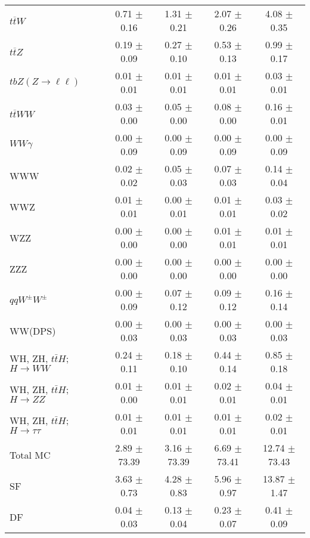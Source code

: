 \begin{tabular}{l|cccc}
                   $t\overline{t}W$ &  0.71 $\pm$  0.16 &  1.31 $\pm$  0.21 &  2.07 $\pm$  0.26 &  4.08 $\pm$  0.35 \\
                   $t\overline{t}Z$ &  0.19 $\pm$  0.09 &  0.27 $\pm$  0.10 &  0.53 $\pm$  0.13 &  0.99 $\pm$  0.17 \\
    $tbZ (Z \rightarrow \ell \ell)$ &  0.01 $\pm$  0.01 &  0.01 $\pm$  0.01 &  0.01 $\pm$  0.01 &  0.03 $\pm$  0.01 \\
                  $t\overline{t}WW$ &  0.03 $\pm$  0.00 &  0.05 $\pm$  0.00 &  0.08 $\pm$  0.00 &  0.16 $\pm$  0.01 \\
                         $WW\gamma$ &  0.00 $\pm$  0.09 &  0.00 $\pm$  0.09 &  0.00 $\pm$  0.09 &  0.00 $\pm$  0.09 \\
                                WWW &  0.02 $\pm$  0.02 &  0.05 $\pm$  0.03 &  0.07 $\pm$  0.03 &  0.14 $\pm$  0.04 \\
                                WWZ &  0.01 $\pm$  0.01 &  0.00 $\pm$  0.01 &  0.01 $\pm$  0.01 &  0.03 $\pm$  0.02 \\
                                WZZ &  0.00 $\pm$  0.00 &  0.00 $\pm$  0.00 &  0.01 $\pm$  0.01 &  0.01 $\pm$  0.01 \\
                                ZZZ &  0.00 $\pm$  0.00 &  0.00 $\pm$  0.00 &  0.00 $\pm$  0.00 &  0.00 $\pm$  0.00 \\
                 $qqW^{\pm}W^{\pm}$ &  0.00 $\pm$  0.09 &  0.07 $\pm$  0.12 &  0.09 $\pm$  0.12 &  0.16 $\pm$  0.14 \\
                            WW(DPS) &  0.00 $\pm$  0.03 &  0.00 $\pm$  0.03 &  0.00 $\pm$  0.03 &  0.00 $\pm$  0.03 \\
WH, ZH, $t\bar{t}H$; $H \rightarrow WW$ &  0.24 $\pm$  0.11 &  0.18 $\pm$  0.10 &  0.44 $\pm$  0.14 &  0.85 $\pm$  0.18 \\
WH, ZH, $t\bar{t}H$; $H \rightarrow ZZ$ &  0.01 $\pm$  0.00 &  0.01 $\pm$  0.01 &  0.02 $\pm$  0.01 &  0.04 $\pm$  0.01 \\
WH, ZH, $t\bar{t}H$; $H \rightarrow \tau\tau$ &  0.01 $\pm$  0.01 &  0.01 $\pm$  0.01 &  0.01 $\pm$  0.01 &  0.02 $\pm$  0.01 \\
\hline\hline
                           Total MC &  2.89 $\pm$ 73.39 &  3.16 $\pm$ 73.39 &  6.69 $\pm$ 73.41 & 12.74 $\pm$ 73.43 \\
\hline
                                 SF &  3.63 $\pm$  0.73 &  4.28 $\pm$  0.83 &  5.96 $\pm$  0.97 & 13.87 $\pm$  1.47 \\
                                 DF &  0.04 $\pm$  0.03 &  0.13 $\pm$  0.04 &  0.23 $\pm$  0.07 &  0.41 $\pm$  0.09 \\

\end{tabular}
